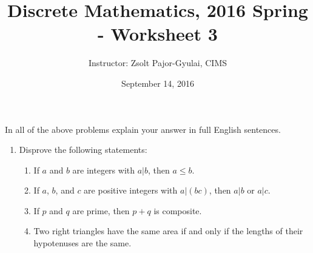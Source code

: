 \documentclass[11pt]{preprint}
\title{Discrete Mathematics, 2016 Spring - Worksheet 3}
\author{Instructor: Zsolt Pajor-Gyulai, CIMS}
\date{September 14, 2016}
\begin{document}
\maketitle

In all of the above problems explain your answer in full English sentences.

\begin{enumerate}
\item Disprove the following statements:
\begin{enumerate}
\item If $a$ and $b$ are integers with $a|b$, then $a\leq b$.
\item If $a$, $b$, and $c$ are positive integers with $a|(bc)$, then $a|b$ or $a|c$.
\item If $p$ and $q$ are prime, then $p+q$ is composite.
\item Two right triangles have the same area if and only if the lengths of their hypotenuses are the same.
\end{enumerate}


\end{enumerate}
\end{document}

